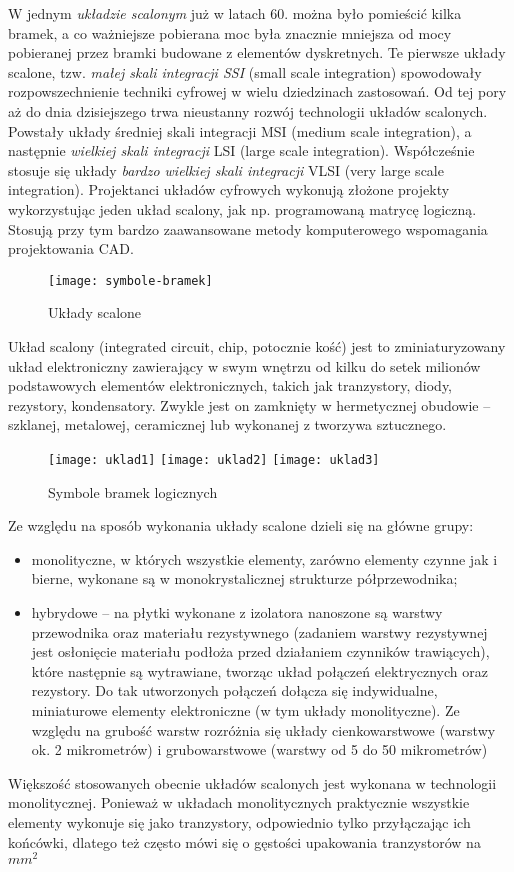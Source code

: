 \documentclass[openany,a4paper,11pt]{article}
\begin{document}
 W jednym \emph{ układzie scalonym } już w latach 60. można było pomieścić kilka bramek, a co ważniejsze pobierana moc była znacznie mniejsza od mocy pobieranej przez bramki budowane z elementów dyskretnych. Te pierwsze układy scalone, tzw. \emph {małej skali integracji SSI} (small scale integration) spowodowały rozpowszechnienie techniki cyfrowej w wielu dziedzinach zastosowań. Od tej pory aż do dnia dzisiejszego trwa nieustanny rozwój technologii układów scalonych. Powstały układy średniej skali integracji MSI (medium scale integration), a następnie \emph {wielkiej skali integracji } LSI (large scale integration). Współcześnie stosuje się układy \emph {bardzo wielkiej skali integracji }VLSI (very large scale integration). Projektanci układów cyfrowych wykonują złożone projekty wykorzystując jeden układ scalony, jak np. programowaną matrycę logiczną. Stosują przy tym bardzo zaawansowane metody komputerowego wspomagania projektowania CAD.

\begin{figure}
\centerline{\texttt{[image: symbole-bramek]}}
\caption{Układy scalone}
\end{figure}

  Układ scalony (integrated circuit, chip, potocznie kość) jest to zminiaturyzowany układ elektroniczny zawierający w swym wnętrzu od kilku do setek milionów podstawowych elementów elektronicznych, takich jak tranzystory, diody, rezystory, kondensatory. Zwykle jest on zamknięty w hermetycznej obudowie -- szklanej, metalowej, ceramicznej lub wykonanej z tworzywa sztucznego.

\begin{figure}[ht]
\begin{center}
{\texttt{[image: uklad1]}}
{\texttt{[image: uklad2]}}
{\texttt{[image: uklad3]}}
\caption{Symbole bramek logicznych}
\end{center}
\end{figure}

 Ze względu na sposób wykonania układy scalone dzieli się na główne grupy:
\begin{itemize}
\item monolityczne, w których wszystkie elementy, zarówno elementy czynne jak i bierne, wykonane są w monokrystalicznej strukturze półprzewodnika; 
\item hybrydowe -- na płytki wykonane z izolatora nanoszone są warstwy przewodnika oraz materiału rezystywnego (zadaniem warstwy rezystywnej jest osłonięcie materiału podłoża przed działaniem czynników trawiących), które następnie są wytrawiane, tworząc układ połączeń elektrycznych oraz rezystory. Do tak utworzonych połączeń dołącza się indywidualne, miniaturowe elementy elektroniczne (w tym układy monolityczne). Ze względu na grubość warstw rozróżnia się układy cienkowarstwowe (warstwy ok. 2 mikrometrów) i grubowarstwowe (warstwy od 5 do 50 mikrometrów)
\end{itemize}
 Większość stosowanych obecnie układów scalonych jest wykonana w technologii monolitycznej. Ponieważ w układach monolitycznych praktycznie wszystkie elementy wykonuje się jako tranzystory, odpowiednio tylko przyłączając ich końcówki, dlatego też często mówi się o gęstości upakowania tranzystorów na $mm^{2}$
\end{document}
